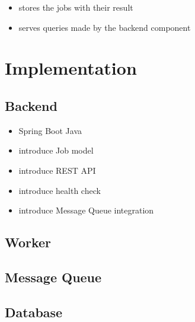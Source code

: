 \begin{itemize}
	\item stores the jobs with their result 
	\item serves queries made by the backend component
\end{itemize}

\section{Implementation}

\subsection{Backend}

\begin{itemize}
	\item Spring Boot Java
	\item introduce Job model
	\item introduce REST API
	\item introduce health check
	\item introduce Message Queue integration
\end{itemize}

\subsection{Worker}

\subsection{Message Queue}

\subsection{Database}

















